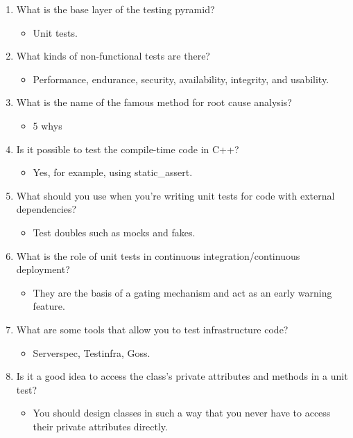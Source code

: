 \begin{enumerate}
\item
What is the base layer of the testing pyramid?
\begin{itemize}
\item 
Unit tests.
\end{itemize}

\item
What kinds of non-functional tests are there?
\begin{itemize}
\item 
Performance, endurance, security, availability, integrity, and usability.
\end{itemize}

\item
What is the name of the famous method for root cause analysis?
\begin{itemize}
\item 
5 whys
\end{itemize}

\item
Is it possible to test the compile-time code in C++?
\begin{itemize}
\item 
Yes, for example, using static\_assert.
\end{itemize}

\item
What should you use when you're writing unit tests for code with external dependencies?
\begin{itemize}
\item 
Test doubles such as mocks and fakes.
\end{itemize}

\item
What is the role of unit tests in continuous integration/continuous deployment?
\begin{itemize}
\item 
They are the basis of a gating mechanism and act as an early warning feature.
\end{itemize}

\item
What are some tools that allow you to test infrastructure code?
\begin{itemize}
\item 
Serverspec, Testinfra, Goss.
\end{itemize}

\item
Is it a good idea to access the class's private attributes and methods in a unit test?
\begin{itemize}
\item 
You should design classes in such a way that you never have to access their private attributes directly.
\end{itemize}
\end{enumerate}